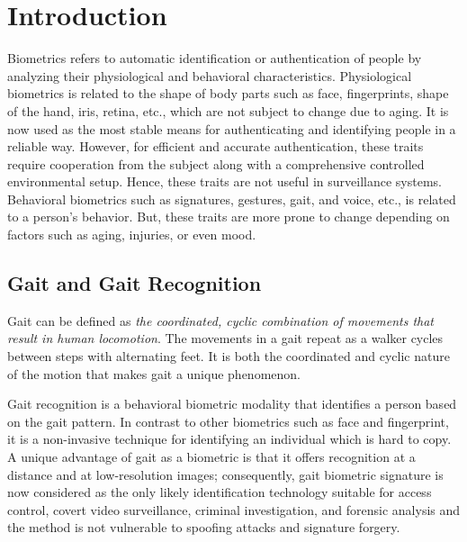 \chapter{Introduction}\label{intro}
Biometrics refers to automatic identification or authentication of people by analyzing their physiological and behavioral characteristics. Physiological biometrics is related to the shape of body parts such as face, fingerprints, shape of the hand, iris, retina, etc., which are not subject to change due to aging. It is now used as the most stable means for authenticating and identifying people in a reliable way. However, for efficient and accurate authentication, these traits require cooperation from the subject along with a comprehensive controlled environmental setup. Hence, these traits are not useful in surveillance systems. Behavioral biometrics such as signatures, gestures, gait, and voice, etc., is related to a person’s behavior. But, these traits are more prone to change depending on factors such as aging, injuries, or even mood. 

\section{Gait and Gait Recognition}
Gait can be defined as \textit{the coordinated, cyclic combination of movements that result in human locomotion}. The movements in a gait repeat as a walker cycles between steps with alternating feet. It is both the coordinated and cyclic nature of the motion that makes gait a unique phenomenon.

Gait recognition is a behavioral biometric modality that identifies a person based on the gait pattern. In contrast to other biometrics such as face and fingerprint, it is a non-invasive technique for identifying an individual which is hard to copy. A unique advantage of gait as a biometric is that it offers recognition at a distance and at low-resolution images; consequently, gait biometric signature is now considered as the only likely identification technology suitable for access control, covert video surveillance, criminal investigation, and forensic analysis and the method is not vulnerable to spoofing attacks and signature forgery.


